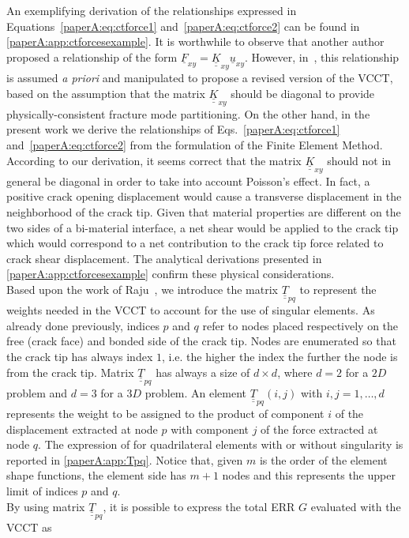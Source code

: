 An exemplifying derivation of the relationships expressed in Equations~\ref{paperA:eq:ctforce1} and~\ref{paperA:eq:ctforce2} can be found in \ref{paperA:app:ctforcesexample}. It is worthwhile to observe that another author~\cite{Valvo2011} proposed a relationship of the form $\underline{F}_{xy}=\underline{\underline{K}}_{xy}\underline{u}_{xy}$. However, in~\cite{Valvo2011}, this relationship is assumed \emph{a priori} and manipulated to propose a revised version of the VCCT, based on the assumption that the matrix $\underline{\underline{K}}_{xy}$ should be diagonal to provide physically-consistent fracture mode partitioning. On the other hand, in the present work we derive the relationships of Eqs.~\ref{paperA:eq:ctforce1} and~\ref{paperA:eq:ctforce2} from the formulation of the Finite Element Method. According to our derivation, it seems correct that the matrix $\underline{\underline{K}}_{xy}$ should not in general be diagonal in order to take into account Poisson's effect. In fact, a positive crack opening displacement would cause a transverse displacement in the neighborhood of the crack tip. Given that material properties are different on the two sides of a bi-material interface, a net shear would be applied to the crack tip which would correspond to a net contribution to the crack tip force related to crack shear displacement. The analytical derivations presented in \ref{paperA:app:ctforcesexample} confirm these physical considerations.\\
Based upon the work of Raju~\cite{Raju1987}, we introduce the matrix $\underline{\underline{T}}_{pq}$ to represent the weights needed in the VCCT to account for the use of singular elements. As already done previously, indices $p$ and $q$ refer to nodes placed respectively on the free (crack face) and bonded side of the crack tip. Nodes are enumerated so that the crack tip has always index $1$, i.e. the higher the index the further the node is from the crack tip. Matrix $\underline{\underline{T}}_{pq}$ has always a size of $d\times d$, where $d=2$ for a $2D$ problem and $d=3$ for a $3D$ problem. An element $\underline{\underline{T}}_{pq}\left(i,j\right)$ with $i,j=1,\dots,d$ represents the weight to be assigned to the product of component $i$ of the displacement extracted at node $p$ with component $j$ of the force extracted at node $q$. The expression of  for quadrilateral elements with or without singularity is reported in \ref{paperA:app:Tpq}. Notice that, given $m$ is the order of the element shape functions, the element side has $m+1$ nodes and this represents the upper limit of indices $p$ and $q$.\\%
By using matrix $\underline{\underline{T}}_{pq}$, it is possible to express the total ERR $G$ evaluated with the VCCT as

